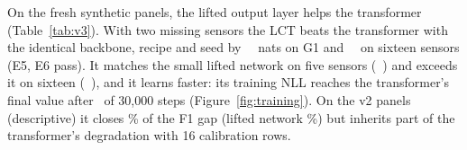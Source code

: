 \noindent On the fresh synthetic panels, the lifted output layer helps the transformer (Table~\ref{tab:v3}). With two
missing sensors the LCT beats the transformer with the identical backbone, recipe and seed by
\VthreeGOnekTwolctvspfnabs\ \VthreeGOnekTwolctvspfnci\ nats on G1 and \VthreeGThreekTwolctvspfnabs\
\VthreeGThreekTwolctvspfnci\ on sixteen sensors (E5, E6 pass). It matches the small lifted network on five sensors
(\VthreeGOnekTwolctvslift\ \VthreeGOnekTwolctvsliftci) and exceeds it on sixteen (\VthreeGThreekTwolctvslift\
\VthreeGThreekTwolctvsliftci), and it learns faster: its training NLL reaches the transformer's final value after
\Trainlctreach\ of 30{,}000 steps (Figure~\ref{fig:training}). On the v2 panels (descriptive) it closes \Gaplct\% of
the F1 gap (lifted network \GapliftOne\%) but inherits part of the transformer's degradation with 16 calibration rows.

